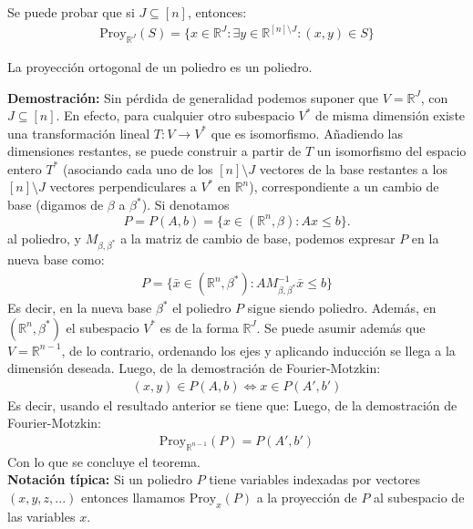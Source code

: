 Se puede probar que si $J \subseteq [n]$, entonces:
\begin{align}
    \text{Proy}_{\mathbb{R}^{J}}(S)= \{x\in \mathbb{R}^{J}: \exists y \in \mathbb{R}^{[n]\setminus J}: (x,y)\in S \}
\end{align}
\begin{teo}
La proyección ortogonal de un poliedro es un poliedro.
\end{teo}
\textbf{Demostración:}
Sin pérdida de generalidad podemos suponer que $V = \mathbb{R}^{J}$, con $J \subseteq [n]$. En efecto, para cualquier otro subespacio $V^{*}$ de misma dimensión existe una transformación lineal $T:V \rightarrow V^{*}$ que es isomorfismo. Añadiendo las dimensiones restantes, se puede construir a partir de $T$ un isomorfismo del espacio entero $T^{*}$ (asociando cada uno de los $[n]\setminus J$ vectores de la base restantes a los $[n]\setminus J$ vectores perpendiculares a $V^{*}$ en $\mathbb{R}^{n}$), correspondiente a un cambio de base (digamos de $\beta$ a $\beta^{*}$). Si denotamos 
$$P= P(A,b) = \{x \in (\mathbb{R}^{n},\beta): Ax \leq b\}.$$
al poliedro, y $M_{\beta,\beta^{*}}$ a la matriz de cambio de base, podemos expresar $P$ en la nueva base como:
\begin{align*}
    P = \{\bar{x} \in (\mathbb{R}^{n},\beta^{*}): AM_{\beta,\beta^{*}}^{-1}\bar{x} \leq b\}
\end{align*}
Es decir, en la nueva base $\beta^{*}$ el poliedro $P$ sigue siendo poliedro. Además, en $(\mathbb{R}^{n},\beta^{*})$ el subespacio $V^{*}$ es de la forma $\mathbb{R}^{J}$. Se puede asumir además que $V = \mathbb{R}^{n-1}$, de lo contrario, ordenando los ejes y aplicando inducción se llega a la dimensión deseada. Luego, de la demostración de Fourier-Motzkin:
\begin{align}
    (x,y) \in P(A,b)\Leftrightarrow x \in P(A',b')
\end{align}
Es decir, usando el resultado anterior se tiene que:
Luego, de la demostración de Fourier-Motzkin:
\begin{align}
   \text{Proy}_{\mathbb{R}^{n-1}}(P) = P(A',b')
\end{align}
Con lo que se concluye el teorema.\\

\textbf{Notación típica: }
Si un poliedro $P$ tiene variables indexadas por vectores $(x,y,z,...)$ entonces llamamos $\text{Proy}_{x}(P)$ a la proyección de $P$ al subespacio de las variables $x$.\\


